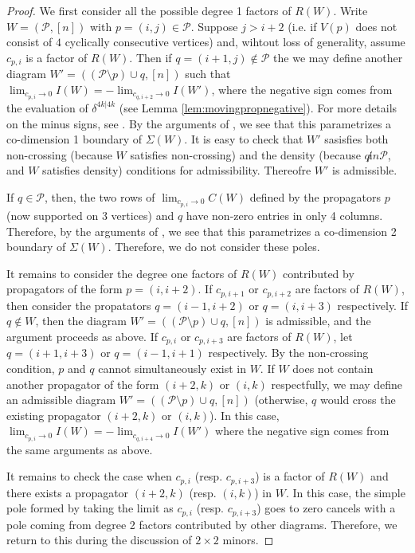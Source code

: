 \documentclass[11pt]{article}
\newcommand{\cP}{\mathcal{P}}
\theoremstyle{remark}
\theoremstyle{definition}
\begin{document}
\begin{proof}
We first consider all the possible degree 1 factors of $R(W)$. Write $W = (\cP, [n])$ with $p= (i,j)  \in \cP$. Suppose $j > i+2$ (i.e. if $V(p)$ does not consist of $4$ cyclically consecutive vertices) and, wihtout loss of generality, assume $c_{p, i}$ is a factor of $R(W)$. Then if $q = (i+1, j) \not \in \cP$ the we may define another diagram $W' = ((\cP \setminus p) \cup q, [n])$ such that $\lim_{c_{p, i} \rightarrow 0} I(W) = -\lim_{c_{q, i+2} \rightarrow 0} I(W')$, where the negative sign comes from the evaluation of $\delta^{4k|4k}$ (see Lemma \ref{lem:movingpropnegative}). For more details on the minus signs, see \cite{casestudy, HeslopSteward, correlahedron}. By the arguments of \cite{basisshapeloci}, we see that this parametrizes a co-dimension 1 boundary of $\Sigma(W)$. It is easy to check that $W'$ sasisfies both non-crossing (because $W$ satisfies non-crossing) and the density (because $q \not in \cP$, and $W$ satisfies density) conditions for admissibility. Thereofre $W'$ is admissible. 

If $q \in \cP$, then, the two rows of $\lim_{c_{p, i} \rightarrow 0}C(W)$ defined by the propagators $p$ (now supported on 3 vertices) and $q$ have non-zero entries in only 4 columns. Therefore, by the arguments of \cite{basisshapeloci}, we see that this parametrizes a co-dimension 2 boundary of $\Sigma(W)$. Therefore, we do not consider these poles. 

It remains to consider the degree one factors of $R(W)$ contributed by propagators of the form $p = (i, i+2)$. If $c_{p, i+1}$ or $c_{p, i+2}$ are factors of $R(W)$, then consider the propatators $q = (i-1, i+2)$ or $q = (i, i+3)$ respectively. If $q \not \in W$, then the diagram $W' = ((\cP \setminus p)\cup q, [n])$ is admissible, and the argument proceeds as above. If $c_{p, i}$ or $c_{p, i+3}$ are factors of $R(W)$, let $q = (i+1, i+3)$ or $q = (i-1, i+1)$ respectively. By the non-crossing condition, $p$ and $q$ cannot simultaneously exist in $W$. If $W$ does not contain another propagator of the form $(i+2, k)$ or $(i, k)$ respectfully, we may define an admissible diagram $W' = ((\cP \setminus p)\cup q, [n])$ (otherwise, $q$ would cross the existing propagator $(i+2, k)$ or $(i, k)$).  In this case, $\lim_{c_{p, i} \rightarrow 0} I(W) = -\lim_{c_{q, i+4} \rightarrow 0} I(W')$ where the negative sign comes from the same arguments as above. 

It remains to check the case when $c_{p, i}$ (resp. $c_{p, i+3}$) is a factor of $R(W)$ and there exists a propagator $(i+2, k)$ (resp. $(i, k)$) in $W$. In this case, the simple pole formed by taking the limit as $c_{p, i}$ (resp. $c_{p, i+3}$) goes to zero cancels with a pole coming from degree 2 factors contributed by other diagrams. Therefore, we return to this during the discussion of $2 \times 2$ minors. 


\end{proof}
\end{document}
